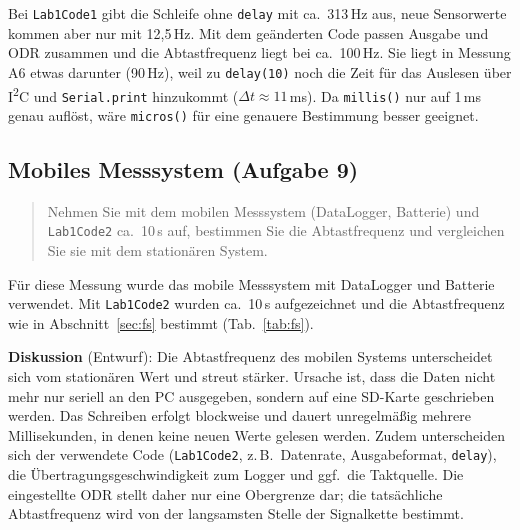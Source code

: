 \documentclass[a4paper,oneside,10pt]{article}
\begin{document}
Bei \texttt{Lab1Code1} gibt die Schleife ohne \texttt{delay} mit ca.\ 313\,Hz aus,
neue Sensorwerte kommen aber nur mit 12{,}5\,Hz. Mit dem geänderten Code passen
Ausgabe und ODR zusammen und die Abtastfrequenz liegt bei ca.\ 100\,Hz. Sie liegt in
Messung A6 etwas darunter (90\,Hz), weil zu \texttt{delay(10)} noch die Zeit für das
Auslesen über I\textsuperscript{2}C und \texttt{Serial.print} hinzukommt
($\Delta t \approx 11$\,ms). Da \texttt{millis()} nur auf 1\,ms genau auflöst, wäre
\texttt{micros()} für eine genauere Bestimmung besser geeignet.

\subsection{Mobiles Messsystem (Aufgabe 9)}

\begin{quote}
Nehmen Sie mit dem mobilen Messsystem (DataLogger, Batterie) und \texttt{Lab1Code2}
ca.\ 10\,s auf, bestimmen Sie die Abtastfrequenz und vergleichen Sie sie mit dem
stationären System.
\end{quote}


Für diese Messung wurde das mobile Messsystem mit DataLogger und Batterie verwendet.
Mit \texttt{Lab1Code2} wurden ca.\ 10\,s aufgezeichnet und die Abtastfrequenz wie in
Abschnitt~\ref{sec:fs} bestimmt (Tab.~\ref{tab:fs}).

\textbf{Diskussion} (Entwurf): Die Abtastfrequenz des mobilen Systems unterscheidet
sich vom stationären Wert und streut stärker. Ursache ist, dass die Daten nicht
mehr nur seriell an den PC ausgegeben, sondern auf eine SD-Karte geschrieben werden.
Das Schreiben erfolgt blockweise und dauert unregelmäßig mehrere Millisekunden, in
denen keine neuen Werte gelesen werden. Zudem unterscheiden sich der verwendete Code
(\texttt{Lab1Code2}, z.\,B.\ Datenrate, Ausgabeformat, \texttt{delay}), die
Übertragungsgeschwindigkeit zum Logger und ggf.\ die Taktquelle. Die eingestellte
ODR stellt daher nur eine Obergrenze dar; die tatsächliche Abtastfrequenz wird von
der langsamsten Stelle der Signalkette bestimmt.

\end{document}

